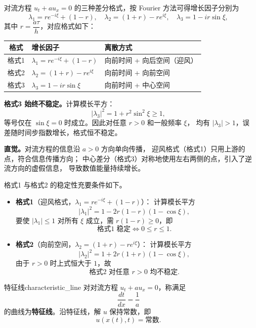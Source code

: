 \begin{note}
对流方程 $u_t + au_x = 0$ 的三种差分格式，按 Fourier 方法可得增长因子分别为
\[
\lambda_1 = r e^{-i\xi} + (1-r), \quad
\lambda_2 = (1+r) - r e^{i\xi}, \quad
\lambda_3 = 1 - ir\sin\xi,
\]
其中 $r = \dfrac{a\tau}{h}$，对应格式如下：

\begin{center}
\begin{tabular}{cll}
\toprule
格式 & 增长因子 & 离散方式 \\
\midrule
格式1 & $\lambda_1 = re^{-i\xi} + (1-r)$ & 向前时间 + 向后空间（迎风） \\
格式2 & $\lambda_2 = (1+r) - re^{i\xi}$ & 向前时间 + 向前空间 \\
格式3 & $\lambda_3 = 1 - ir\sin\xi$ & 向前时间 + 中心空间 \\
\bottomrule
\end{tabular}
\end{center}

\noindent\textbf{格式3 始终不稳定。}计算模长平方：
\[
|\lambda_3|^2 = 1 + r^2\sin^2\xi \geq 1,
\]
等号仅在 $\sin\xi = 0$ 时成立。因此对任意 $r > 0$ 和一般频率 $\xi$，
均有 $|\lambda_3| > 1$，误差随时间步指数增长，格式恒不稳定。

\noindent\textbf{直觉。}对流方程的信息沿 $a > 0$ 方向单向传播，
迎风格式（格式1）只用上游的点，符合信息传播方向；
中心差分（格式3）对称地使用左右两侧的点，引入了逆流方向的虚假信息，
导致数值能量持续增长。
\end{note}
\begin{dxtips}
    

格式1 与格式2 的稳定性充要条件如下。
\begin{itemize}
    \item \textbf{格式1}（迎风格式，$\lambda_1 = re^{-i\xi} + (1-r)$）：
    计算模长平方
    \[
    |\lambda_1|^2 = 1 - 2r(1-r)(1-\cos\xi),
    \]
    要使 $|\lambda_1| \leq 1$ 对所有 $\xi$ 成立，需 $r(1-r) \geq 0$，即
    \[
    \text{格式1 稳定} \iff 0 \leq r \leq 1.
    \]

    \item \textbf{格式2}（向前空间，$\lambda_2 = (1+r) - re^{i\xi}$）：
    计算模长平方
    \[
    |\lambda_2|^2 = 1 + 2r(1+r)(1-\cos\xi),
    \]
    由于 $r > 0$ 时上式恒大于 $1$，故
    \[
    \text{格式2 对任意 } r > 0 \text{ 均不稳定}.
    \]
\end{itemize}
\end{dxtips}
\begin{definition}{特征线}{characteristic_line}
对对流方程 $u_t + au_x = 0$，称满足
\[
\frac{dt}{dx} = \frac{1}{a}
\]
的曲线为\textbf{特征线}。沿特征线，解 $u$ 保持常数，即
\[
u(x(t), t) = \text{常数}.
\]
\end{definition}

